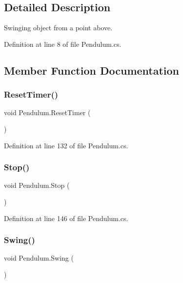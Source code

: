 \subsection{Detailed Description}
Swinging object from a point above. 



Definition at line 8 of file Pendulum.\+cs.



\subsection{Member Function Documentation}
\mbox{\label{class_pendulum_a434f2a286d40ece8198d30a1511d5597}} 
\subsubsection{\texorpdfstring{Reset\+Timer()}{ResetTimer()}}
{\footnotesize\ttfamily void Pendulum.\+Reset\+Timer (\begin{DoxyParamCaption}{ }\end{DoxyParamCaption})}



Definition at line 132 of file Pendulum.\+cs.

\mbox{\label{class_pendulum_a011916372c24b9024a1d2399c6baaf10}} 
\subsubsection{\texorpdfstring{Stop()}{Stop()}}
{\footnotesize\ttfamily void Pendulum.\+Stop (\begin{DoxyParamCaption}{ }\end{DoxyParamCaption})}



Definition at line 146 of file Pendulum.\+cs.

\mbox{\label{class_pendulum_a56bbfd6f6dbd2ab68ea6497a7d1f4065}} 
\subsubsection{\texorpdfstring{Swing()}{Swing()}}
{\footnotesize\ttfamily void Pendulum.\+Swing (\begin{DoxyParamCaption}{ }\end{DoxyParamCaption})}



